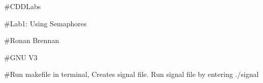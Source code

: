 \#\+C\+D\+D\+Labs

\#\+Lab1\+: Using Semaphores

\#\+Ronan Brennan

\#\+G\+NU V3

\#\+Run makefile in terminal, Creates signal file. Run signal file by entering ./signal 